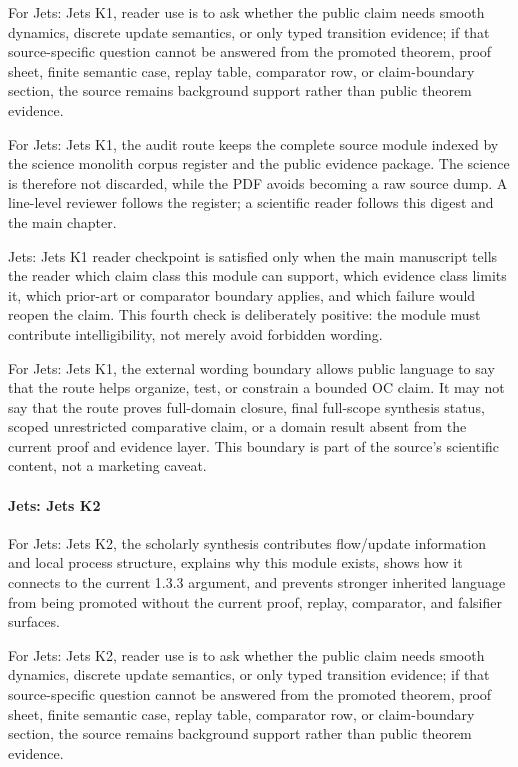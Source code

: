 For Jets: Jets K1, reader use is to ask whether the public claim needs smooth dynamics, discrete update semantics, or only typed transition evidence; if that source-specific question cannot be answered from the promoted theorem, proof sheet, finite semantic case, replay table, comparator row, or claim-boundary section, the source remains background support rather than public theorem evidence.


For Jets: Jets K1, the audit route keeps the complete source module indexed by the science monolith corpus register and the public evidence package. The science is therefore not discarded, while the PDF avoids becoming a raw source dump. A line-level reviewer follows the register; a scientific reader follows this digest and the main chapter.


Jets: Jets K1 reader checkpoint is satisfied only when the main manuscript tells the reader which claim class this module can support, which evidence class limits it, which prior-art or comparator boundary applies, and which failure would reopen the claim. This fourth check is deliberately positive: the module must contribute intelligibility, not merely avoid forbidden wording.


For Jets: Jets K1, the external wording boundary allows public language to say that the route helps organize, test, or constrain a bounded OC claim. It may not say that the route proves full-domain closure, final full-scope synthesis status, scoped unrestricted comparative claim, or a domain result absent from the current proof and evidence layer. This boundary is part of the source's scientific content, not a marketing caveat.


\paragraph{Jets: Jets K2}

For Jets: Jets K2, the scholarly synthesis contributes flow/update information and local process structure, explains why this module exists, shows how it connects to the current 1.3.3 argument, and prevents stronger inherited language from being promoted without the current proof, replay, comparator, and falsifier surfaces.


For Jets: Jets K2, reader use is to ask whether the public claim needs smooth dynamics, discrete update semantics, or only typed transition evidence; if that source-specific question cannot be answered from the promoted theorem, proof sheet, finite semantic case, replay table, comparator row, or claim-boundary section, the source remains background support rather than public theorem evidence.


